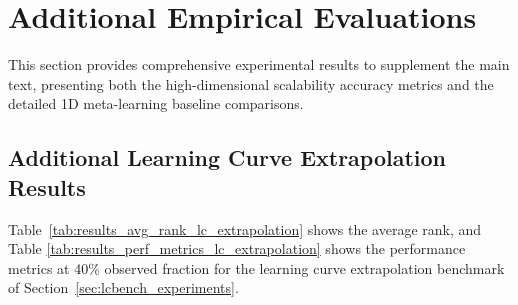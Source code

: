 \documentclass{article}
\begin{document}
\section{Additional Empirical Evaluations}
\label{apd:additional_experiments}

This section provides comprehensive experimental results to supplement the main text, presenting both the high-dimensional scalability accuracy metrics and the detailed 1D meta-learning baseline comparisons.

\subsection{Additional Learning Curve Extrapolation Results}

Table~\ref{tab:results_avg_rank_lc_extrapolation} shows the average rank,
and
Table \ref{tab:results_perf_metrics_lc_extrapolation} shows the performance metrics at 40\% observed fraction for the learning curve extrapolation benchmark of Section~\ref{sec:lcbench_experiments}.
\end{document}
